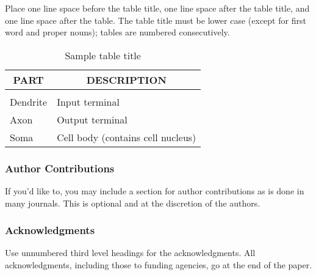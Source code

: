 Place one line space before the table title, one line space after the table
title, and one line space after the table. The table title must be lower case
(except for first word and proper nouns); tables are numbered consecutively.

\begin{table}[t]
	\caption{Sample table title}
	\label{sample-table}
	\begin{center}
		\begin{tabular}{ll}
			\multicolumn{1}{c}{\bf PART} & \multicolumn{1}{c}{\bf DESCRIPTION}
			\\ \hline \\
			Dendrite                     & Input terminal                      \\
			Axon                         & Output terminal                     \\
			Soma                         & Cell body (contains cell nucleus)   \\
		\end{tabular}
	\end{center}
\end{table}

\subsubsection*{Author Contributions}
If you'd like to, you may include  a section for author contributions as is done
in many journals. This is optional and at the discretion of the authors.

\subsubsection*{Acknowledgments}
Use unnumbered third level headings for the acknowledgments. All
acknowledgments, including those to funding agencies, go at the end of the paper.



